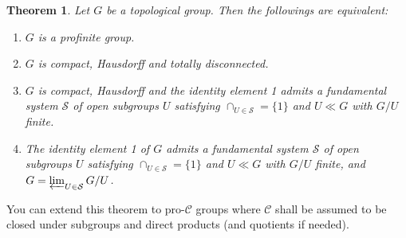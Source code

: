 \documentclass[12pt]{report}
\newtheorem{theorem}{Theorem}[section]
\theoremstyle{definition}
\begin{document}
\begin{theorem}
	Let $G$ be a topological group. Then the followings are equivalent:
	\begin{enumerate}
		\item $G$ is a profinite group.
		\item $G$ is compact, Hausdorff and totally disconnected.
		\item $G$ is compact, Hausdorff and the identity element 1 admits a fundamental system $\mathcal{S}$ of open subgroups $U$ satisfying $\cap_{U\in \mathcal{S}}=\{1\}$ and $U\ll G$ with $G/U$ finite.
		\item The identity element 1 of $G$ admits a fundamental system $\mathcal{S}$ of open subgroups $U$ satisfying $\cap_{U\in \mathcal{S}}=\{1\}$ and $U\ll G$ with $G/U$ finite, and $G=\varprojlim_{U\in \mathcal{S}} G/U$.
	\end{enumerate}
\end{theorem}

\begin{remark}
	You can extend this theorem to pro-$\mathcal{C}$ groups where $\mathcal{C}$ shall be assumed to be closed under subgroups and direct products (and quotients if needed).
\end{remark}
\end{document}
